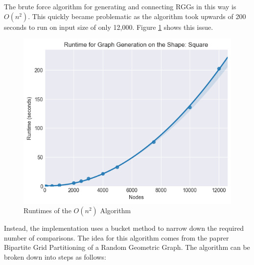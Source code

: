 \documentclass{article}
\begin{document}
    The brute force algorithm for generating and connecting RGGs in this way is $O(n^2)$.
    This quickly became problematic as the algorithm took upwards of 200 seconds to run on input size of only 12,000.
    Figure \ref{brute_force_runtimes} shows this issue.
    \begin{figure}
      \label{brute_force_runtimes}
      \includegraphics[width=1 \textwidth]{square/runtime/runtime_chart_naive}
      \caption{Runtimes of the $O(n^2)$ Algorithm}
    \end{figure}
    Instead, the implementation uses a bucket method to narrow down the required number of comparisons.
    The idea for this algorithm comes from the paprer Bipartite Grid Partitioning of a Random Geometric Graph\cite{chen2017bipartite}.
    The algorithm can be broken down into steps as follows:
\end{document}
